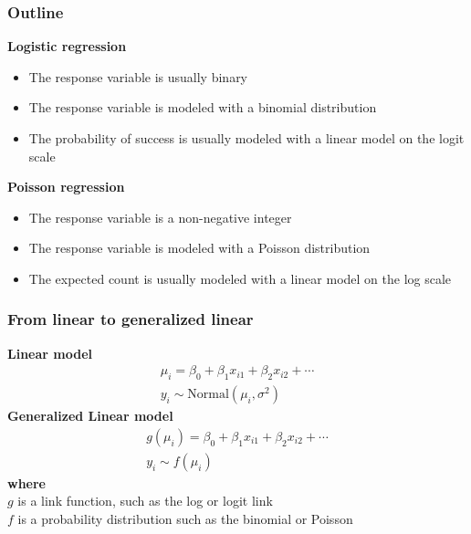 \documentclass[color=usenames,dvipsnames]{beamer}\usepackage[]{graphicx}\usepackage[]{color}
\begin{document}
\begin{frame}
  \frametitle{Outline}
  {\bf Logistic regression \\}
  \begin{itemize}
    \item The response variable is usually binary
    \item The response variable is modeled with a binomial distribution
    \item The probability of success is usually modeled with a linear
      model on the logit scale
  \end{itemize}
  \pause
  \vfill
  {\bf Poisson regression \\}
  \begin{itemize}
    \item The response variable is a non-negative integer
    \item The response variable is modeled with a Poisson distribution
    \item The expected count is usually modeled with a linear
      model on the log scale
  \end{itemize}
  \vfill
\end{frame}





\begin{frame}
  \frametitle{From linear to generalized linear}
  {\bf Linear model}
  \begin{gather*}
    \mu_i = \beta_0 + \beta_1 x_{i1} + \beta_2 x_{i2} + \cdots \\
    y_i \sim \mathrm{Normal}(\mu_i, \sigma^2)
  \end{gather*}
  \pause
  \vfill
  {\bf Generalized Linear model}
  \begin{gather*}
    g(\mu_i) = \beta_0 + \beta_1 x_{i1} + \beta_2 x_{i2} + \cdots \\
    y_i \sim f(\mu_i)
  \end{gather*}
  \pause
  {\bf where} \\
  $g$ is a link function, such as the log or logit link \\
  \pause
  $f$ is a probability distribution such as the binomial or Poisson
\end{frame}
\end{document}
